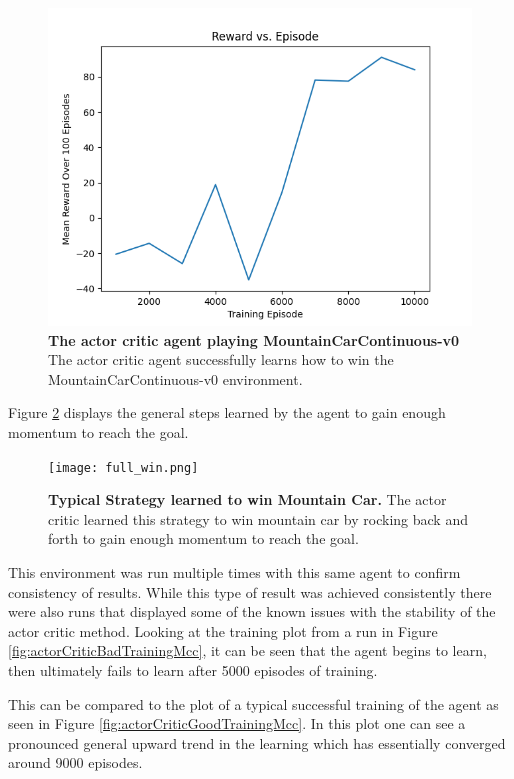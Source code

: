 \documentclass[conference]{IEEEtran}
\begin{document}
\begin{figure}[htbp]
\centerline{\includegraphics[scale=0.5]{best_actor_critic_mcc_test.png}}
\caption{\textbf{The actor critic agent playing MountainCarContinuous-v0}  The actor critic agent successfully learns how to win the MountainCarContinuous-v0 environment.}
\label{fig:actorCriticGoodTestRewardMcc}
\end{figure}

Figure \ref{fig:fullWinA2CMountainCar} displays the general steps learned by the agent to gain enough momentum to reach the goal.

\begin{figure}[htbp]
\centerline{\texttt{[image: full\_win.png]}}
\caption{\textbf{Typical Strategy learned to win Mountain Car.}  The actor critic learned this strategy to win mountain car by rocking  back and forth to gain enough momentum to reach the goal.}
\label{fig:fullWinA2CMountainCar}
\end{figure}

This environment was run multiple times with this same agent to confirm consistency of results.
While this type of result was achieved consistently there were also runs that displayed some of the known issues with the stability of the actor critic method.
Looking at the training plot from a run in Figure \ref{fig:actorCriticBadTrainingMcc},  it can be seen that the agent begins to learn, then ultimately fails to learn after 5000 episodes of training.

This can be compared to the plot of a typical successful training of the agent as seen in Figure \ref{fig:actorCriticGoodTrainingMcc}.
In this plot one can see a pronounced general upward trend in the learning which has essentially converged around 9000 episodes.
\end{document}
